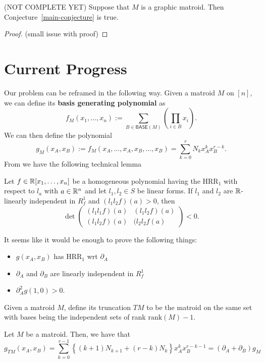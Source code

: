 \documentclass[12pt]{article}
\begin{document}
\begin{thm}
	(NOT COMPLETE YET) Suppose that $M$ is a graphic matroid. Then Conjecture~\ref{main-conjecture} is true.
\end{thm}
\begin{proof}
	(small issue with proof) 
\end{proof}

\section{Current Progress}

Our problem can be reframed in the following way. Given a matroid $M$ on $[n]$, we can define its \textbf{basis generating polynomial} as 
\[
	f_M (x_1, \ldots, x_n) := \sum_{B \in \mathsf{BASE}(M)} \left ( \prod_{i \in B} x_i \right ). 
\]
We can then define the polynomial
\[
	g_M (x_A, x_B) := f_M(x_A, \ldots, x_A, x_B, \ldots, x_B) = \sum_{k = 0}^r N_k x_A^k x_B^{r-k}.
\]
From \cite{strictness-of-basis-generating-polynomial} we have the following technical lemma
\begin{lem}
	Let $f \in \mathbb{R}[x_1, \ldots, x_n]$ be a homogeneous polynomial having the $\text{HRR}_1$ with respect to $l_a$ with $a \in \mathbb{R}^n$ and let $l_1, l_2 \in S$ be linear forms. If $l_1$ and $l_2$ are $\mathbb{R}$-linearly independent in $R_f^1$ and $(l_1l_2f)(a) > 0$, then 
	\[
		\det \begin{pmatrix}
			(l_1l_1f)(a) & (l_1l_2f)(a) \\
			(l_1l_2f)(a) & (l_2l_2f(a)
		\end{pmatrix} < 0.
	\]
\end{lem}

It seems like it would be enough to prove the following things:
\begin{itemize}
	\item $g(x_A, x_B)$ has $\text{HRR}_1$ wrt $\partial_A$
	\item $\partial_A$ and $\partial_B$ are linearly independent in $R_f^1$
	\item $\partial_A^2 g (1, 0) > 0$. 
\end{itemize}

Given a matroid $M$, define its truncation $TM$ to be the matroid on the same set with bases being the independent sets of rank $\text{rank}(M) - 1$. 

\begin{prop}
	Let $M$ be a matroid. Then, we have that 
	\[
		g_{TM} (x_A, x_B) = \sum_{k = 0}^{r-1} \left \{ (k+1)N_{k+1} + (r-k) N_k\right \} x_A^k x_B^{r-k-1} = (\partial_A + \partial_B) g_M
	\]
\end{prop}
\end{document}
